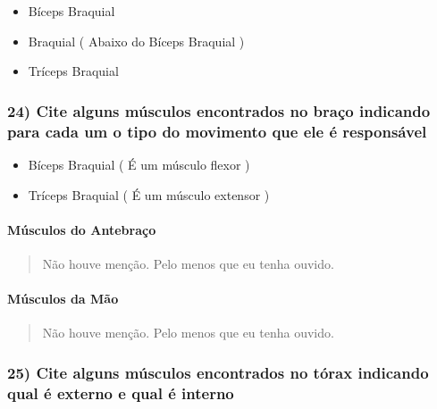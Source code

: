 \documentclass[
]{book}
\providecommand{\tightlist}{%
  \setlength{\itemsep}{0pt}\setlength{\parskip}{0pt}}
\begin{document}
\begin{itemize}
\tightlist
\item
  Bíceps Braquial
\item
  Braquial ( Abaixo do Bíceps Braquial )
\item
  Tríceps Braquial
\end{itemize}

\hypertarget{cite-alguns-muxfasculos-encontrados-no-brauxe7o-indicando-para-cada-um-o-tipo-do-movimento-que-ele-uxe9-responsuxe1vel}{%
\subsubsection*{24) Cite alguns músculos encontrados no braço indicando para cada um o tipo do movimento que ele é responsável}\label{cite-alguns-muxfasculos-encontrados-no-brauxe7o-indicando-para-cada-um-o-tipo-do-movimento-que-ele-uxe9-responsuxe1vel}}

\begin{itemize}
\tightlist
\item
  Bíceps Braquial ( É um músculo flexor )
\item
  Tríceps Braquial ( É um músculo extensor )
\end{itemize}

\hypertarget{muxfasculos-do-antebrauxe7o-1}{%
\paragraph{Músculos do Antebraço}\label{muxfasculos-do-antebrauxe7o-1}}

\begin{quote}
Não houve menção. Pelo menos que eu tenha ouvido.
\end{quote}

\hypertarget{muxfasculos-da-muxe3o-1}{%
\paragraph{Músculos da Mão}\label{muxfasculos-da-muxe3o-1}}

\begin{quote}
Não houve menção. Pelo menos que eu tenha ouvido.
\end{quote}

\hypertarget{cite-alguns-muxfasculos-encontrados-no-tuxf3rax-indicando-qual-uxe9-externo-e-qual-uxe9-interno}{%
\subsubsection*{25) Cite alguns músculos encontrados no tórax indicando qual é externo e qual é interno}\label{cite-alguns-muxfasculos-encontrados-no-tuxf3rax-indicando-qual-uxe9-externo-e-qual-uxe9-interno}}
\end{document}
